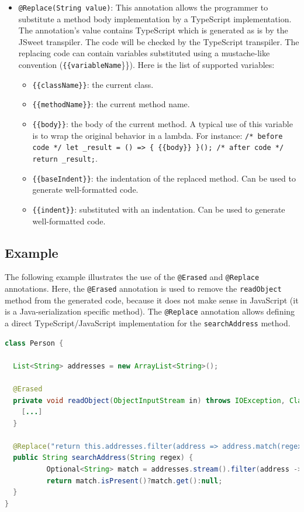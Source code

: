 \documentclass[a4paper]{report}
\begin{document}
\begin{itemize}
\item \texttt{@Replace(String value)}:  This annotation allows the programmer to substitute a method body implementation by a TypeScript implementation. The annotation's value contains TypeScript which is generated as is by the JSweet transpiler. The code will be checked by the TypeScript transpiler. The replacing code can contain variables substituted using a mustache-like convention (\texttt{\{\{variableName}\}\}). Here is the list of supported variables:
\begin{itemize}
\item \texttt{\{\{className\}\}}: the current class.
\item \texttt{\{\{methodName\}\}}: the current method name.
\item \texttt{\{\{body\}\}}: the body of the current method. A typical use of this variable
 is to wrap the original behavior in a lambda. For instance:
 \texttt{/* before code */ let \_result = () => \{ \{\{body\}\} \}(); /* after code */ return \_result;}.
\item \texttt{\{\{baseIndent\}\}}: the indentation of the replaced method. Can be used to generate well-formatted code.
\item \texttt{\{\{indent\}\}}: substituted with an indentation. Can be used to generate well-formatted code.
\end{itemize}
\end{itemize}

\subsection{Example}

The following example illustrates the use of the \texttt{@Erased} and \texttt{@Replace} annotations. Here, the \texttt{@Erased} annotation is used to remove the \texttt{readObject} method from the generated code, because it does not make sense in JavaScript (it is a Java-serialization specific method). The \texttt{@Replace} annotation allows defining a direct TypeScript/JavaScript implementation for the \texttt{searchAddress} method.

\begin{lstlisting}[language=Java]
class Person {

  List<String> addresses = new ArrayList<String>();

  @Erased
  private void readObject(ObjectInputStream in) throws IOException, ClassNotFoundException {
    [...]
  }

  @Replace("return this.addresses.filter(address => address.match(regex))[0]")
  public String searchAddress(String regex) {
          Optional<String> match = addresses.stream().filter(address -> address.matches(regex)).findFirst();
          return match.isPresent()?match.get():null;
  }
}
\end{lstlisting}
\end{document}
